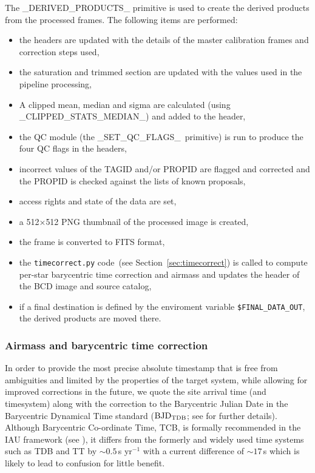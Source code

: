 \documentclass[twoside,11pt,nolof]{starlink}
\providecommand{\task}[1]{\textsf{#1}}
\providecommand{\Ast}{\texttt{timecorrect.py} code}
\begin{document}
The \task{\_DERIVED\_PRODUCTS\_} primitive is used to create the derived products from the processed frames. The
following items are performed:
\begin{itemize}
\item  the headers are updated with the details of the master calibration frames
   and correction steps used,
\item  the saturation and trimmed section are updated with the values used in
   the pipeline processing,
\item  A clipped mean, median and sigma are calculated (using
\task{\_CLIPPED\_STATS\_MEDIAN\_}) and added to the header,
\item  the QC module (the \task{\_SET\_QC\_FLAGS\_}\ primitive) is run to produce the four QC flags in the headers,
\item  incorrect values of the TAGID and/or PROPID are flagged and corrected
   and the PROPID is checked against the lists of known proposals,
\item  access rights and state of the data are set,
\item  a 512$\times$512 PNG thumbnail of the processed image is created,
\item  the frame is converted to FITS format,
\item  the \Ast\ (see Section~\ref{sec:timecorrect}) is called to compute per-star barycentric time
   correction and airmass and updates the header of the BCD image and
   source catalog,
\item  if a final destination is defined by the enviroment variable
   \texttt{\$FINAL\_DATA\_OUT}, the derived products are moved there.
\end{itemize}

\subsubsection{Airmass and barycentric time
correction\label{sec:timecorrect}}


In order to provide the most precise absolute timestamp that is free from
ambiguities and limited by the properties of the target system, while allowing
for improved corrections in the future, we quote the site arrival time (and
timesystem) along with the correction to the Barycentric Julian Date in the
Barycentric Dynamical Time standard (${\rm BJD}_{\rm TDB}$; see \cite{eastman2010} for
further details). Although Barycentric Co-ordinate Time, TCB, is formally
recommended in the IAU framework (see \cite{iers2010}), it differs from the
formerly and widely used time systems such as TDB and TT by
$\sim0.5$\,s yr$^{-1}$ with a current difference of $\sim17$\,s which is likely to
lead to confusion for little benefit.
\end{document}
